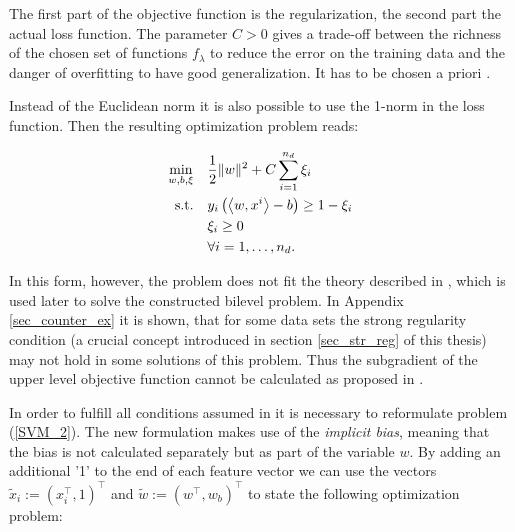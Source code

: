 The first part of the objective function is the regularization, the second part the actual loss function. 
The parameter \(C > 0\) gives a trade-off between the richness of the chosen set of functions \(f_{\lambda}\) to reduce the error on the training data and the danger of overfitting to have good generalization. It has to be chosen a priori \cite{Kunapuli2008}.

Instead of the Euclidean norm it is also possible to use the 1-norm in the loss function. Then the resulting optimization problem reads:

\begin{align}
\begin{split}
	\min_{w,b,\xi} \quad & \frac{1}{2} \|w\|^2+C\sum_{i=1}^{n_d}{\xi_i} \\
	\text{s.t.} \quad & y_i\left(\left\langle w,x^i\right\rangle-b\right) \geq 1 - \xi_i \\
	& \xi_i \geq 0 \\
	& 	\forall i = 1, \dots , n_d.
\end{split}
\label{SVM_1}
\end{align}

In this form, however, the problem does not fit the theory described in \cite{Outrata1998}, which is used later to solve the constructed bilevel problem. In Appendix \ref{sec_counter_ex} it is shown, that for some data sets the strong regularity condition (a crucial concept introduced in section \ref{sec_str_reg} of this thesis) may not hold in some solutions of this problem. Thus the subgradient of the upper level objective function cannot be calculated as proposed in \cite{Outrata1998}.


In order to fulfill all conditions assumed in \cite{Outrata1998} it is necessary to reformulate problem (\ref{SVM_2}).
The new formulation makes use of the \emph{implicit bias}, meaning that the bias is not calculated separately but as part of the variable \(w\). 
By adding an additional '1' to the end of each feature vector we can use the vectors \(\tilde{x}_i := (x_i^{\top},1)^{\top}\) and \(\tilde{w} := (w^{\top},w_b)^{\top}\) to state the following optimization problem:

